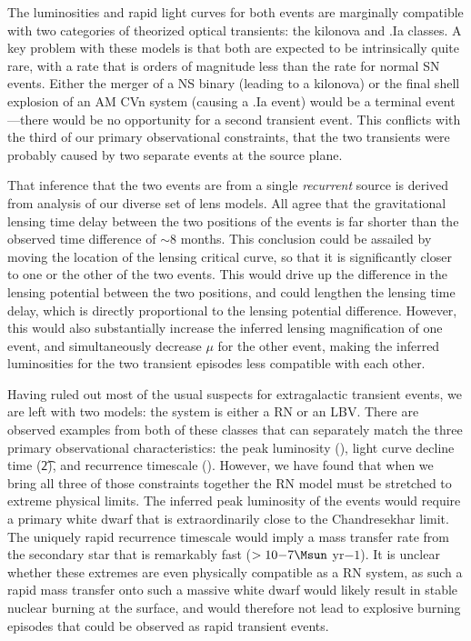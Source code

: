 The luminosities and rapid light curves for both \spock events are
marginally compatible with two categories of theorized optical
transients: the kilonova and .Ia classes.  A key problem with these
models is that both are expected to be intrinsically quite rare, with
a rate that is orders of magnitude less than the rate for normal SN
events.  Either the merger of a NS binary (leading to a kilonova) or
the final shell explosion of an AM CVn system (causing a .Ia event)
would be a terminal event---there would be no opportunity for a second
transient event.  This conflicts with the third of our primary
observational constraints, that the two \spock transients were
probably caused by two separate events at the source plane.

That inference that the two events are from a single {\em recurrent}
source is derived from analysis of our diverse set of lens models.
All agree that the gravitational lensing time delay between the two
positions of the \spock events is far shorter than the observed time
difference of $\sim$8 months.  This conclusion could be assailed by
moving the location of the lensing critical curve, so that it is
significantly closer to one or the other of the two events.  This
would drive up the difference in the lensing potential between the two
\spock positions, and could lengthen the lensing time delay, which is
directly proportional to the lensing potential difference.  However,
this would also substantially increase the inferred lensing
magnification of one event, and simultaneously decrease $\mu$ for the
other event, making the inferred luminosities for the two transient
episodes less compatible with each other.

Having ruled out most of the usual suspects for extragalactic
transient events, we are left with two models: the \spock system
is either a RN or an LBV.  There are observed examples from both of
these classes that can separately match the three primary
observational characteristics: the peak luminosity (\Lpk), light curve
decline time (\t2), and recurrence timescale (\trec).  However, we
have found that when we bring all three of those constraints together
the RN model must be stretched to extreme physical limits. The
inferred peak luminosity of the \spock events would require a primary
white dwarf that is extraordinarily close to the Chandresekhar limit.
The uniquely rapid recurrence timescale would imply a mass transfer
rate from the secondary star that is remarkably fast ($>10{-7} \Msun$
yr${-1}$).  It is unclear whether these extremes are even physically
compatible as a RN system, as such a rapid mass transfer onto such a
massive white dwarf would likely result in stable nuclear burning at
the surface, and would therefore not lead to explosive burning
episodes that could be observed as rapid transient events.

